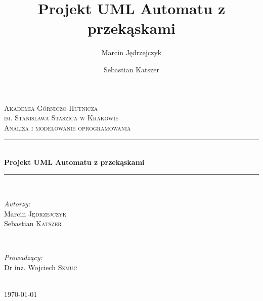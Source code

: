 \documentclass[a4paper, 11pt]{article}
\author{Marcin Jędrzejczyk \and Sebastian Katszer }
\title{Projekt UML Automatu z przekąskami }
\newcommand{\HRule}{\rule{\linewidth}{0.5mm}} %
\begin{document}
\begin{titlepage}


\center %

\textsc{\LARGE Akademia Górniczo-Hutnicza    \\im. Stanisława Staszica w Krakowie}\\[1.5cm] %
\textsc{\Large Analiza i modelowanie oprogramowania}\\[0.5cm] %


\HRule \\[0.4cm]
{ \huge \bfseries Projekt UML Automatu z przekąskami}\\[0.4cm] %
\HRule \\[5.5cm]
 

\begin{minipage}{0.4\textwidth}
\begin{flushleft} \large 
\emph{Autorzy:}\\
Marcin \textsc{Jędrzejczyk} \\
Sebastian \textsc{Katszer}\\

\end{flushleft}
\end{minipage}
~
\begin{minipage}{0.4\textwidth}
\begin{flushright} \large
\emph{Prowadzący:}\\
 Dr inż. Wojciech \textsc{Szmuc} %
\end{flushright}
\end{minipage} \\[5cm]

{\large \today}\\[3cm]
\vfill
\end{titlepage}
\newpage
\end{document}
